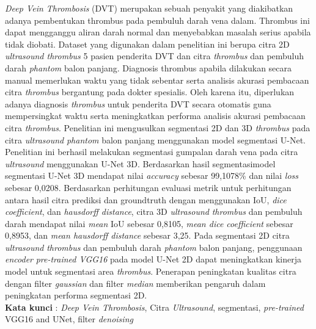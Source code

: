 \begin{spacing}{1}
	
\textit{Deep Vein Thrombosis} (DVT) merupakan sebuah penyakit yang diakibatkan adanya pembentukan thrombus pada pembuluh darah vena dalam. Thrombus ini dapat mengganggu aliran darah normal dan menyebabkan masalah serius apabila tidak diobati. Dataset yang digunakan dalam penelitian ini berupa citra 2D \textit{ultrasound thrombus} 5 pasien penderita DVT dan citra \textit{thrombus} dan pembuluh darah \textit{phantom} balon panjang. Diagnosis thrombus apabila dilakukan secara manual memerlukan waktu yang tidak sebentar serta analisis akurasi pembacaan citra \textit{thrombus} bergantung pada dokter spesialis. Oleh karena itu, diperlukan adanya diagnosis \textit{thrombus} untuk penderita DVT secara otomatis guna mempersingkat waktu serta meningkatkan performa analisis akurasi pembacaan citra \textit{thrombus}. Penelitian ini mengusulkan segmentasi 2D dan 3D \textit{thrombus} pada citra \textit{ultrasound} \textit{phantom} balon panjang menggunakan model segmentasi U-Net. Penelitian ini berhasil melakukan segmentasi gumpalan darah vena pada citra \textit{ultrasound} menggunakan U-Net 3D. Berdasarkan hasil segmentasimodel segmentasi U-Net 3D mendapat nilai \textit{accuracy} sebesar 99,1078\% dan nilai \textit{loss} sebesar 0,0208. Berdasarkan perhitungan evaluasi metrik untuk perhitungan antara hasil citra prediksi dan groundtruth dengan menggunakan IoU, \textit{dice coefficient}, dan \textit{hausdorff distance}, citra 3D \textit{ultrasound} \textit{thrombus} dan pembuluh darah mendapat nilai \textit{mean} IoU sebesar 0,8105, \textit{mean dice coefficient} sebesar 0,8953, dan \textit{mean hausdorff distance} sebesar 3,25. Pada segmentasi 2D citra \textit{ultrasound} \textit{thrombus} dan pembuluh darah \textit{phantom} balon panjang, penggunaan \textit{encoder} \textit{pre-trained VGG16} pada model U-Net 2D dapat meningkatkan kinerja model untuk segmentasi area \textit{thrombus}. Penerapan peningkatan kualitas citra dengan filter \textit{gaussian} dan filter \textit{median} memberikan pengaruh dalam peningkatan performa segmentasi 2D. \\

\vspace{2ex}
\textbf{Kata kunci }: \textit{Deep Vein Thrombosis},  Citra \textit{Ultrasound}, segmentasi, \textit{pre-trained} VGG16 and UNet, filter \textit{denoising}
	
\end{spacing}